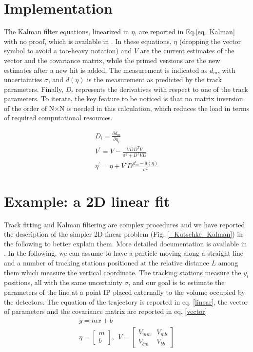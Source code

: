 \section{Implementation}
    The Kalman filter equations, linearized in $\eta$, are reported in Eq.\ref{eq_Kalman} with no proof, which is available in \cite{KutschkePaper}. 
    In these equations, $\eta$ (dropping the vector symbol to avoid a too-heavy notation) and $V$ are the current estimates of the vector and the covariance matrix, while the primed versions are the new estimates after a new hit is added. 
    The measurement is indicated as $d_m$, with uncertainties $\sigma$, and $d(\eta)$ is the measurement as predicted by the track parameters. 
    Finally, $D_i$ represents the derivatives with respect to one of the track parameters. 
    To iterate, the key feature to be noticed is that no matrix inversion of the order of N$\times$N is needed in this calculation, which reduces the load in terms of required computational resources.

    \begin{equation}
        \begin{gathered}
            D_i = \frac{\partial d_m}{\partial \eta_i} \\
            V^\prime = V - \frac{VDD^TV}{\sigma^2+D^TVD}\\
            \eta^\prime = \eta + V^\prime D \frac{d_m-d(\eta)}{\sigma^2}
        \end{gathered} 
        \label{eq_Kalman}
    \end{equation}

\section{Example: a 2D linear fit}
    \label{2Dfit}
    Track fitting and Kalman filtering are complex procedures and we have reported the description of the simpler 2D linear problem (Fig. \ref{_Kutschke_Kalman}) in the following to better explain them. 
    More detailed documentation is available in \cite{Kutschke} \cite{KutschkePaper}. 
    In the following, we can assume to have a particle moving along a straight line and a number of tracking stations positioned at the relative distance $L$ among them which measure the vertical coordinate.
    The tracking stations measure the $y_i$ positions, all with the same uncertainty $\sigma$, and our goal is to estimate the parameters of the line at a point IP placed externally to the volume occupied by the detectors.
    The equation of the trajectory is reported in eq. \ref{linear}, the vector of parameters and the covariance matrix are reported in eq. \ref{vector}
    \begin{gather}
        y = mx +b \label{linear}\\
        \eta = \begin{bmatrix} m \\  b \end{bmatrix},\ \ V=\begin{bmatrix} V_{mm}& V_{mb} \\ V_{bm}& V_{bb} \end{bmatrix} \label{vector}
    \end{gather}  

